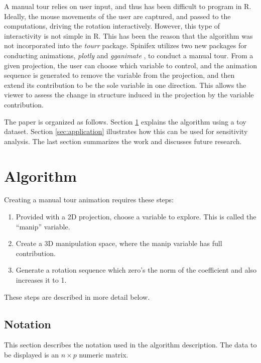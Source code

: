 \documentclass{monashthesis}
\begin{document}
A manual tour relies on user input, and thus has been difficult to program in R. Ideally, the mouse movements of the user are captured, and passed to the computations, driving the rotation interactively. However, this type of interactivity is not simple in R. This has been the reason that the algorithm was not incorporated into the \emph{tourr} package. Spinifex utilizes two new packages for conducting animations, \emph{plotly} \autocite{sievert_plotly_2018} and \emph{gganimate} \autocite{pedersen_gganimate:_2019}, to conduct a manual tour. From a given projection, the user can choose which variable to control, and the animation sequence is generated to remove the variable from the projection, and then extend its contribution to be the sole variable in one direction. This allows the viewer to assess the change in structure induced in the projection by the variable contribution.

The paper is organized as follows. Section \ref{sec:algorithm} explains the algorithm using a toy dataset. Section \ref{sec:application} illustrates how this can be used for sensitivity analysis. The last section summarizes the work and discusses future research.

\hypertarget{sec:algorithm}{%
\section{Algorithm}\label{sec:algorithm}}

Creating a manual tour animation requires these steps:

\begin{enumerate}
\def\labelenumi{\arabic{enumi}.}
\tightlist
\item
  Provided with a 2D projection, choose a variable to explore. This is called the ``manip'' variable.
\item
  Create a 3D manipulation space, where the manip variable has full contribution.
\item
  Generate a rotation sequence which zero's the norm of the coefficient and also increases it to 1.
\end{enumerate}

These steps are described in more detail below.

\hypertarget{notation}{%
\subsection{Notation}\label{notation}}

This section describes the notation used in the algorithm description. The data to be displayed is an \(n \times p\) numeric matrix.
\end{document}
